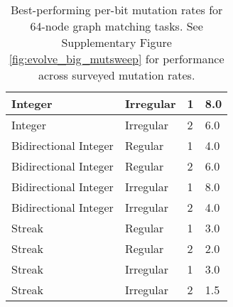 \begin{table}[!htbp]
\begin{tabular}{l|l|l|l}
Integer               & Irregular                 & 1                      & 8.0                                                                                          \\\hline
Integer               & Irregular                 & 2                      & 6.0                                                                                          \\\hline
Bidirectional Integer & Regular                   & 1                      & 4.0                                                                                          \\\hline
Bidirectional Integer & Regular                   & 2                      & 6.0                                                                                          \\\hline
Bidirectional Integer & Irregular                 & 1                      & 8.0                                                                                          \\\hline
Bidirectional Integer & Irregular                 & 2                      & 4.0                                                                                          \\\hline
Streak                & Regular                   & 1                      & 3.0                                                                                          \\\hline
Streak                & Regular                   & 2                      & 2.0                                                                                          \\\hline
Streak                & Irregular                 & 1                      & 3.0                                                                                          \\\hline
Streak                & Irregular                 & 2                      & 1.5                                                                             \end{tabular}

\caption{
Best-performing per-bit mutation rates for 64-node graph matching tasks.
See Supplementary Figure \ref{fig:evolve_big_mutsweep} for performance across surveyed mutation rates.
}
\label{tab:evo_graph_mut_big}


\end{table}
